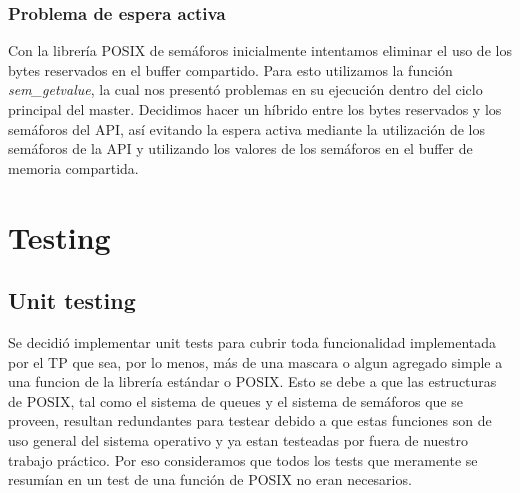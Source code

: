 \documentclass[10pt,a4paper]{report}
\begin{document}
\subsection{Problema de espera activa}
	Con la librería POSIX de semáforos inicialmente intentamos eliminar el uso de los bytes reservados en el buffer compartido. Para esto utilizamos la función \textit{sem\_getvalue}, la cual nos presentó problemas en su ejecución dentro del ciclo principal del master. Decidimos hacer un híbrido entre los bytes reservados y los semáforos del API, así evitando la espera activa mediante la utilización de los semáforos de la API y utilizando los valores de los semáforos en el buffer de memoria compartida.


\chapter{Testing}
\section{Unit testing}
Se decidió implementar unit tests para cubrir toda funcionalidad implementada por el TP que sea, por lo menos, más de una mascara o algun agregado simple a una funcion de la librería estándar o POSIX. 
Esto se debe a que las estructuras de POSIX, tal como el sistema de queues y el sistema de semáforos que se proveen, resultan redundantes para testear debido a que estas funciones son de uso general del sistema operativo y ya estan testeadas por fuera de nuestro trabajo práctico. Por eso consideramos que todos los tests que meramente se resumían en un test de una función de POSIX no eran necesarios.
\end{document}
